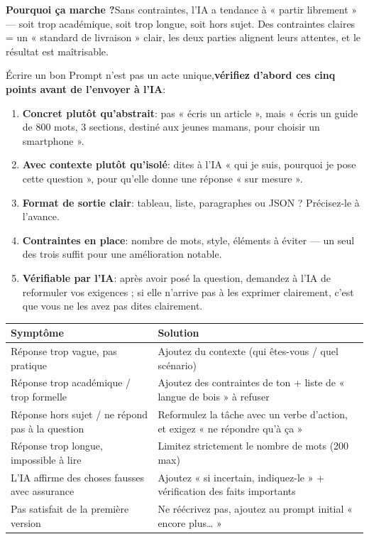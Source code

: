 \textbf{Pourquoi ça marche ?}Sans contraintes, l'IA a tendance à « partir librement » — soit trop académique, soit trop longue, soit hors sujet. Des contraintes claires = un « standard de livraison » clair, les deux parties alignent leurs attentes, et le résultat est maîtrisable.


Écrire un bon Prompt n’est pas un acte unique,\textbf{vérifiez d’abord ces cinq points avant de l’envoyer à l’IA}:

\begin{enumerate}
  \item \textbf{Concret plutôt qu’abstrait}: pas « écris un article », mais « écris un guide de 800 mots, 3 sections, destiné aux jeunes mamans, pour choisir un smartphone ».
  \item \textbf{Avec contexte plutôt qu’isolé}: dites à l’IA « qui je suis, pourquoi je pose cette question », pour qu’elle donne une réponse « sur mesure ».
  \item \textbf{Format de sortie clair}: tableau, liste, paragraphes ou JSON ? Précisez-le à l’avance.
  \item \textbf{Contraintes en place}: nombre de mots, style, éléments à éviter — un seul des trois suffit pour une amélioration notable.
  \item \textbf{Vérifiable par l’IA}: après avoir posé la question, demandez à l’IA de reformuler vos exigences ; si elle n’arrive pas à les exprimer clairement, c’est que vous ne les avez pas dites clairement.
\end{enumerate}


\begin{center}
\begin{tabularx}{\linewidth}{|X|X|}
\hline
\textbf{Symptôme} & \textbf{Solution} \tabularnewline
\hline
Réponse trop vague, pas pratique & Ajoutez du contexte (qui êtes-vous / quel scénario) \tabularnewline
Réponse trop académique / trop formelle & Ajoutez des contraintes de ton + liste de « langue de bois » à refuser \tabularnewline
Réponse hors sujet / ne répond pas à la question & Reformulez la tâche avec un verbe d'action, et exigez « ne répondre qu'à ça » \tabularnewline
Réponse trop longue, impossible à lire & Limitez strictement le nombre de mots (200 max) \tabularnewline
L'IA affirme des choses fausses avec assurance & Ajoutez « si incertain, indiquez-le » + vérification des faits importants \tabularnewline
Pas satisfait de la première version & Ne réécrivez pas, ajoutez au prompt initial « encore plus… » \tabularnewline
\hline
\end{tabularx}
\end{center}

